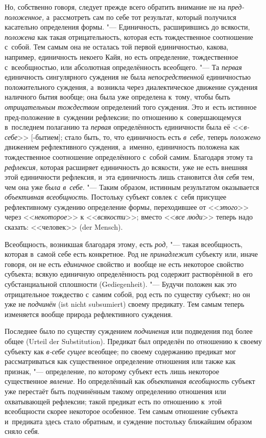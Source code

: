 Но, собственно говоря, следует прежде всего обратить внимание не на
{\em пред-положенное,} а~рассмотреть сам по себе тот результат, который
получился касательно определения формы. "--- Единичность, расширившись до
всякости, {\em положена} как такая отрицательность, которая есть тождественное
соотношение с~собой. Тем самым она не осталась той первой единичностью, какова,
например, единичность некоего Кайя, но есть определение, тождественное
с~всеобщностью, или абсолютная определённость всеобщего. "--- Та {\em первая}
единичность сингулярного суждения не была {\em непосредственной} единичностью
положительного суждения, а~возникла через диалектическое движение суждения
наличного бытия вообще; она была уже определена к~тому, чтобы быть
{\em отрицательным тождеством} определений того суждения. Это и~есть истинное
пред-положение в~суждении рефлексии; по отношению к~совершающемуся в~последнем
полаганию та {\em первая} определённость единичности была её <<{\em в-себе}>>
[-бытием]; стало быть, то, что единичность есть {\em в~себе,} теперь
{\em положено} движением рефлективного суждения, а~именно, единичность положена
как тождественное соотношение определённого с~собой самим. Благодаря этому та
{\em рефлексия,} которая расширяет единичность до всякости, уже не есть внешняя
этой единичности рефлексия, и~эта единичность лишь становится {\em для себя}
тем, чем она уже {\em была в~себе}. "--- Таким образом, истинным результатом
оказывается {\em объективная всеобщность}. Постольку субъект совлек с~себя
присущее рефлективному суждению определение формы, переходившее от
<<{\em этого}>> через <<{\em некоторое}>> к <<{\em всякости}>>; вместо
<<{\em все люди}>> теперь надо сказать: <<человек>> (der Mensch).

Всеобщность, возникшая благодаря этому, есть {\em род,} "--- такая всеобщность,
которая в~самой себе есть конкретное. Род не {\em принадлежит} субъекту или,
иначе говоря, он не есть {\em единичное} свойство и~вообще не есть некоторое
свойство субъекта; всякую единичную определённость род содержит растворённой
в~его субстанциальной сплошности (Gedie\-genheit). "--- Будучи положен как это
отрицательное тождество с~самим собой, род есть по существу субъект; но он уже
не {\em подчинён} (ist nicht subsumiert) своему предикату. Тем самым теперь
изменяется вообще природа рефлективного суждения.

Последнее было по существу суждением {\em подчинения} или подведения под более
общее (Urteil der Substi\-tution). Предикат был определён по отношению к
своему субъекту как {\em в-себе сущее} всеобщее; по своему содержанию предикат
мог рассматриваться как существенное определение отношения или также как
признак, "--- определение, по которому субъект есть лишь некоторое существенное
{\em явление}. Но определённый как {\em объективная всеобщность} субъект уже
перестаёт быть подчинённым такому определению отношения или охватывающей
рефлексии; такой предикат есть по отношению к~этой всеобщности скорее некоторое
особенное. Тем самым отношение субъекта и~предиката здесь стало обратным, и
суждение постольку ближайшим образом сняло себя.

